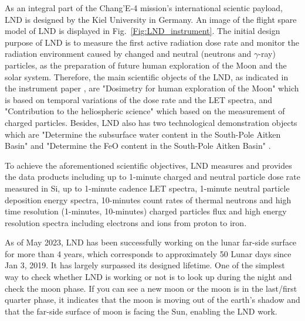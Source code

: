 As an integral part of the Chang'E-4 mission's international scientic payload, \ac{LND} is designed by the Kiel University in Germany. An image of the flight spare model of \ac{LND} is displayed in Fig.~\ref{Fig:LND_instrument}. The initial design purpose of \ac{LND} is to measure the first active radiation dose rate and monitor the radiation environment caused by changed and neutral (neutrons and $\gamma$-ray) particles, as the preparation of future human exploration of the Moon and the solar system. 
Therefore, the main scientific objects of the \ac{LND}, as indicated in the instrument paper \citep{Wimmer-2020-LND}, are "Dosimetry for human exploration of the Moon" which is based on temporal variations of the dose rate and the \ac{LET} spectra, and "Contribution to the heliospheric science" which based on the measurement of charged particles.
Besides, \ac{LND} also has two technological demonstration objects which are "Determine the subsurface water content in the South-Pole Aitken Basin" and "Determine the FeO content in the South-Pole Aitken Basin" \citep{Wimmer-2020-LND}.

To achieve the aforementioned scientific objectives, \ac{LND} measures and provides the data products including up to 1-minute charged and neutral particle dose rate measured in Si, up to 1-minute cadence \ac{LET} spectra, 1-minute neutral particle deposition energy spectra, 10-minutes count rates of thermal neutrons and high time resolution (1-minutes, 10-minutes) charged particles flux and high energy resolution spectra including electrons and ions from proton to iron.

As of May 2023, \ac{LND} has been successfully working on the lunar far-side surface for more than 4 years, which corresponds to approximately 50 Lunar days since Jan 3, 2019. It has largely surpassed its designed lifetime.
One of the simplest way to check whether LND is working or not is to look up during the night and check the moon phase. If you can see a new moon or the moon is in the last/first quarter phase, it indicates that the moon is moving out of the earth's shadow and that the far-side surface of moon is facing the Sun, enabling the \ac{LND} work.

